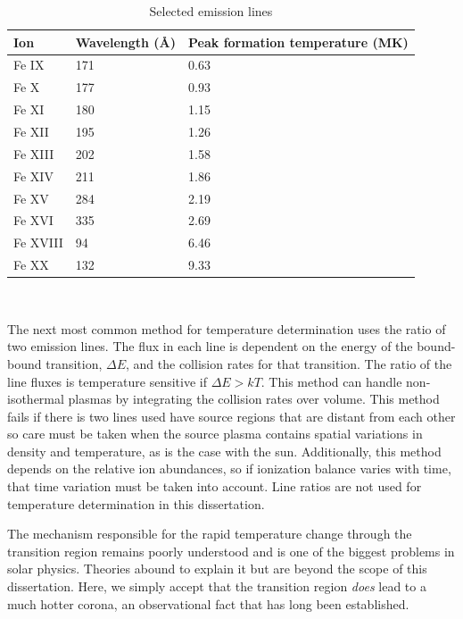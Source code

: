 \begin{table}[!h]
    \caption[Selected emission lines and temperatures]{
        Selected emission lines
    }
    \begin{center}
    \begin{tabular}{|l|l|p{3cm}|} \hline
	Ion & Wavelength (\AA) & Peak formation temperature (MK) \\ \hline \hline
	Fe IX & 171 & 0.63 \\ \hline
	Fe X & 177 & 0.93  \\ \hline
	Fe XI & 180 & 1.15 \\ \hline
	Fe XII & 195 & 1.26 \\ \hline
	Fe XIII & 202 & 1.58 \\ \hline
	Fe XIV & 211 & 1.86 \\ \hline
	Fe XV & 284 & 2.19\\ \hline
	Fe XVI & 335 & 2.69 \\ \hline
	Fe XVIII & 94 & 6.46 \\ \hline
	Fe XX & 132 & 9.33 \\ \hline
	\end{tabular}
    \\ \rule{0mm}{5mm}
    \end{center}
    \label{tab:emissionlines}
\end{table}

The next most common method for temperature determination uses the ratio of two emission lines. The flux in each line is dependent on the energy of the bound-bound transition, $\Delta E$, and the collision rates for that transition. The ratio of the line fluxes is temperature sensitive if $\Delta E > kT$. This method can handle non-isothermal plasmas by integrating the collision rates over volume. This method fails if there is two lines used have source regions that are distant from each other so care must be taken when the source plasma contains spatial variations in density and temperature, as is the case with the sun. Additionally, this method depends on the relative ion abundances, so if ionization balance varies with time, that time variation must be taken into account. Line ratios are not used for temperature determination in this dissertation. 

The mechanism responsible for the rapid temperature change through the transition region remains poorly understood and is one of the biggest problems in solar physics. Theories abound to explain it but are beyond the scope of this dissertation. Here, we simply accept that the transition region \textit{does} lead to a much hotter corona, an observational fact that has long been established. 

